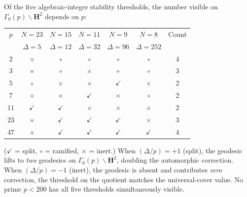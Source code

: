\begin{proposition}
\label{prop:legendre-selection}
Of the five algebraic-integer stability thresholds, the number
visible on $\Gamma_0(p)\backslash\mathbf{H}^2$ depends on $p$:
\begin{center}
\begin{tabular}{ccccccc}
\toprule
$p$ & $N\!=\!23$ & $N\!=\!15$ & $N\!=\!11$ & $N\!=\!9$ & $N\!=\!8$
  & Count \\
& $\Delta\!=\!5$ & $\Delta\!=\!12$ & $\Delta\!=\!32$
  & $\Delta\!=\!96$ & $\Delta\!=\!252$ & \\
\midrule
$2$  & $\times$ & $\circ$ & $\circ$ & $\circ$ & $\circ$ & 4 \\
$3$  & $\times$ & $\circ$ & $\times$ & $\circ$ & $\circ$ & 3 \\
$5$  & $\circ$  & $\times$ & $\times$ & $\checkmark$ & $\times$ & 2 \\
$7$  & $\times$ & $\times$ & $\checkmark$ & $\times$ & $\circ$ & 2 \\
$11$ & $\checkmark$ & $\checkmark$ & $\times$ & $\times$ & $\times$ & 2 \\
$23$ & $\times$ & $\checkmark$ & $\checkmark$ & $\checkmark$ & $\times$ & 3 \\
$47$ & $\times$ & $\checkmark$ & $\checkmark$ & $\checkmark$ & $\checkmark$ & 4 \\
\bottomrule
\end{tabular}
\end{center}
($\checkmark$ = split, $\circ$ = ramified, $\times$ = inert.)
When $(\Delta/p) = +1$ (split), the geodesic lifts to
\emph{two} geodesics on $\Gamma_0(p)\backslash\mathbf{H}^2$,
doubling the automorphic correction.
When $(\Delta/p) = -1$ (inert), the geodesic is absent and
contributes \emph{zero} correction, the threshold on the quotient
matches the universal-cover value.
No prime $p < 200$ has all five thresholds simultaneously visible.
\end{proposition}

